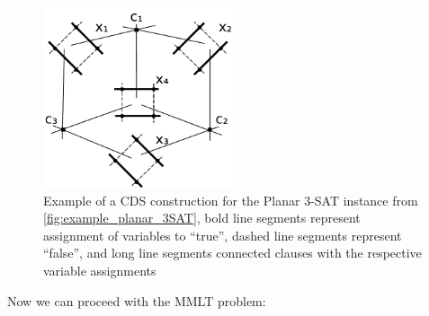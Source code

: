 \begin{figure}[ht]
  \centering
  \includegraphics[width=0.5\textwidth]{img/example_CDS.pdf}
  \caption{\label{fig:example_CDS}Example of a \gls{CDS} construction 
    for the Planar 3-SAT instance from \cref{fig:example_planar_3SAT}, 
    bold line segments represent assignment of variables to ``true'',
    dashed line segments represent ``false'', and long line segments
    connected clauses with the respective variable assignments}
\end{figure}

Now we can proceed with the \gls{MMLT} problem:

